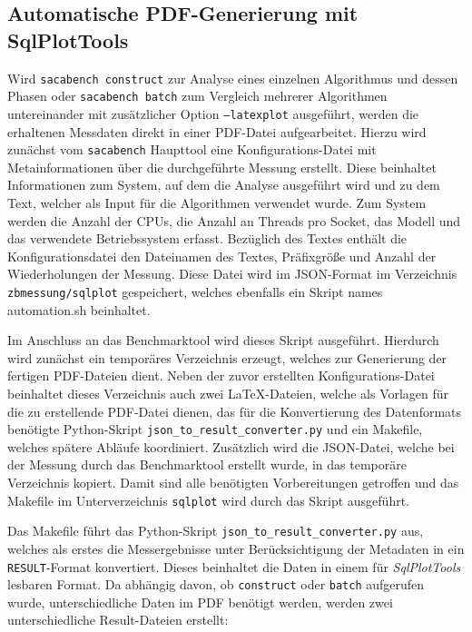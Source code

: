 \subsection{Automatische PDF-Generierung mit SqlPlotTools}
\label{framework:bechmark:sqlplottools}

Wird \texttt{sacabench construct} zur Analyse eines einzelnen Algorithmus und dessen Phasen oder \texttt{sacabench batch} zum Vergleich mehrerer Algorithmen untereinander mit zusätzlicher Option \texttt{--latexplot} ausgeführt, werden die erhaltenen Messdaten direkt in einer PDF-Datei aufgearbeitet.
Hierzu wird zunächst vom \texttt{sacabench} Haupttool eine Konfigurations-Datei mit Metainformationen über die durchgeführte Messung erstellt.
Diese beinhaltet Informationen zum System, auf dem die Analyse ausgeführt wird und zu dem Text, welcher als Input für die Algorithmen verwendet wurde.
Zum System werden die Anzahl der CPUs, die Anzahl an Threads pro Socket, das Modell und das verwendete Betriebssystem erfasst.
Bezüglich des Textes enthält die Konfigurationsdatei den Dateinamen des Textes, Präfixgröße und Anzahl der Wiederholungen der Messung.
Diese Datei wird im JSON-Format im Verzeichnis \texttt{zbmessung/sqlplot} gespeichert, welches ebenfalls ein Skript names automation.sh beinhaltet.\par
Im Anschluss an das Benchmarktool wird dieses Skript ausgeführt.
Hierdurch wird zunächst ein temporäres Verzeichnis erzeugt, welches zur Generierung der fertigen PDF-Dateien dient.
Neben der zuvor erstellten Konfigurations-Datei beinhaltet dieses Verzeichnis auch zwei LaTeX-Dateien, welche als Vorlagen für die zu erstellende PDF-Datei dienen, das für die Konvertierung des Datenformats benötigte Python-Skript \texttt{json\_to\_result\_converter.py} und ein Makefile, welches spätere Abläufe koordiniert.
Zusätzlich wird die JSON-Datei, welche bei der Messung durch das Benchmarktool erstellt wurde, in das temporäre Verzeichnis kopiert.
Damit sind alle benötigten Vorbereitungen getroffen und das Makefile im Unterverzeichnis \texttt{sqlplot} wird durch das Skript ausgeführt.\par\smallskip
Das Makefile führt das Python-Skript \texttt{json\_to\_result\_converter.py} aus, welches als erstes die Messergebnisse unter Berücksichtigung der Metadaten in ein \texttt{RESULT}-Format konvertiert.
Dieses beinhaltet die Daten in einem für \emph{SqlPlotTools} \cite{sqlplottools} lesbaren Format.
Da abhängig davon, ob \texttt{construct} oder \texttt{batch} aufgerufen wurde, unterschiedliche Daten im PDF benötigt werden, werden zwei unterschiedliche Result-Dateien erstellt:
